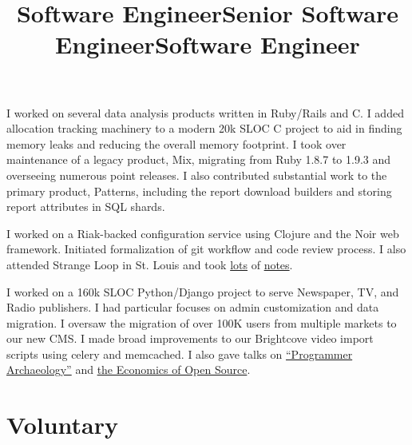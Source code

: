 \documentclass[margintitle,line]{res}
\renewcommand{\subsection}[1]{\section{\normalfont #1}}
\begin{document}
\begin{resume}
\title{Software Engineer}
\begin{position}
  I worked on several data analysis products written in Ruby/Rails and C.
  I added allocation tracking machinery to a modern 20k SLOC C project to aid
  in finding memory leaks and reducing the overall memory footprint. I took
  over maintenance of a legacy product, Mix, migrating from Ruby 1.8.7 to 1.9.3
  and overseeing numerous point releases. I also contributed substantial work
  to the primary product, Patterns, including the report download builders and
  storing report attributes in SQL shards.
\end{position}

\title{Senior Software Engineer}
\begin{position}
  I worked on a Riak-backed configuration service using Clojure and
  the Noir web framework. Initiated formalization of git
  workflow and code review process. I also attended Strange Loop in
  St. Louis and took
  \href{http://blog.kingcons.io/posts/Strange-Loop-Notes---Day-2.html}{lots}
  of
  \href{http://blog.kingcons.io/posts/Strange-Loop-Notes---Day-1.html}{notes}.
\end{position}

\title{Software Engineer}
\begin{position}
  I worked on a 160k SLOC Python/Django project to serve Newspaper,
  TV, and Radio publishers. I had particular focuses on admin
  customization and data migration. I oversaw the migration of over
  100K users from multiple markets to our new CMS.
  I made broad improvements to our Brightcove video import
  scripts using celery and memcached. I also gave talks on
  \href{http://redlinernotes.com/docs/talks/opa.html}{``Programmer
    Archaeology''} and
  \href{http://redlinernotes.com/docs/talks/wosw.html}{the Economics
    of Open Source}.
\end{position}


\subsection{Voluntary}



\end{resume}
\end{document}

